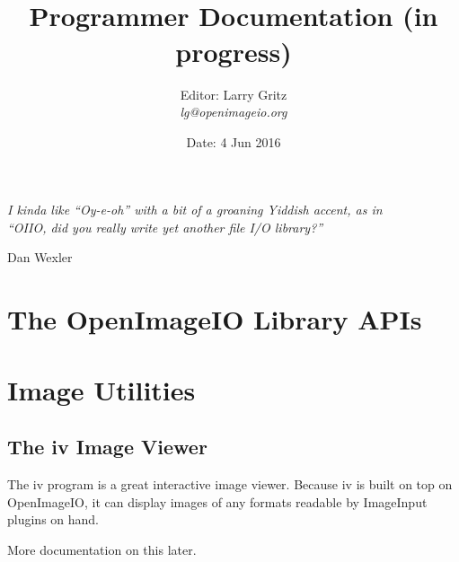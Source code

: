 \documentclass[11pt,letterpaper]{book}
\title{ 
{\Huge{\bf \product}
{\bf\sffamily \versionnumber} \medskip \\ \huge Programmer Documentation
 \large (in progress)
} \bigskip }
\author{Editor: Larry Gritz \\
\emph{lg@openimageio.org}
 \bigskip \\
}
\date{{\large 
Date: 4 Jun 2016
}}
\def\product{{\sffamily OpenImageIO}\xspace}
\def\ImageInput{{\codefont ImageInput}\xspace}
\begin{document}
\frontmatter

\maketitle



\vspace*{2in}

\begin{centering}
\emph{I kinda like ``Oy-e-oh'' with a bit of a groaning Yiddish accent, as in\\
``OIIO, did you really write yet another file I/O library?''} \\
\end{centering}
\medskip
\begin{centering}
\center Dan Wexler \\
\end{centering}




\setcounter{tocdepth}{1}
\tableofcontents

\mainmatter



\part{The OpenImageIO Library APIs}













\part{Image Utilities}



\chapter{The {\kw iv} Image Viewer}
\label{chap:iv}

The {\cf iv} program is a great interactive image viewer.  Because {\cf
  iv} is built on top on \product, it can display images of any formats
readable by \ImageInput plugins on hand.

\medskip

More documentation on this later.
\end{document}
